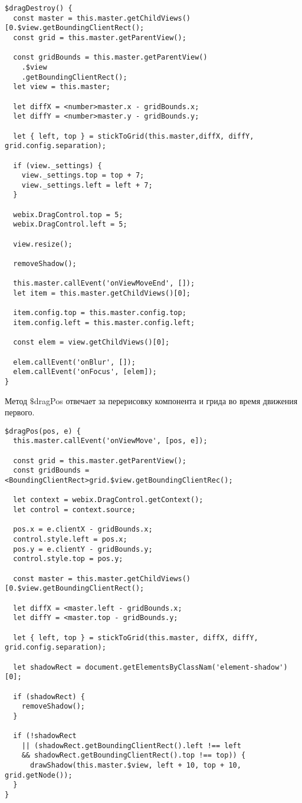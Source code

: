 \begin{lstlisting}
$dragDestroy() {
  const master = this.master.getChildViews()[0.$view.getBoundingClientRect();
  const grid = this.master.getParentView();

  const gridBounds = this.master.getParentView()
    .$view
    .getBoundingClientRect();
  let view = this.master;

  let diffX = <number>master.x - gridBounds.x;
  let diffY = <number>master.y - gridBounds.y;

  let { left, top } = stickToGrid(this.master,diffX, diffY, grid.config.separation);

  if (view._settings) {
    view._settings.top = top + 7;
    view._settings.left = left + 7;
  }

  webix.DragControl.top = 5;
  webix.DragControl.left = 5;

  view.resize();

  removeShadow();

  this.master.callEvent('onViewMoveEnd', []);
  let item = this.master.getChildViews()[0];

  item.config.top = this.master.config.top;
  item.config.left = this.master.config.left;

  const elem = view.getChildViews()[0];

  elem.callEvent('onBlur', []);
  elem.callEvent('onFocus', [elem]);
}
\end{lstlisting}

Метод $\$$dragPos отвечает за перерисовку компонента и грида во время движения первого. 

\begin{lstlisting}
$dragPos(pos, e) {
  this.master.callEvent('onViewMove', [pos, e]);

  const grid = this.master.getParentView();
  const gridBounds = <BoundingClientRect>grid.$view.getBoundingClientRec();

  let context = webix.DragControl.getContext();
  let control = context.source;

  pos.x = e.clientX - gridBounds.x;
  control.style.left = pos.x;
  pos.y = e.clientY - gridBounds.y;
  control.style.top = pos.y;

  const master = this.master.getChildViews()[0.$view.getBoundingClientRect();

  let diffX = <master.left - gridBounds.x;
  let diffY = <master.top - gridBounds.y;

  let { left, top } = stickToGrid(this.master, diffX, diffY, grid.config.separation);

  let shadowRect = document.getElementsByClassNam('element-shadow')[0];

  if (shadowRect) {
    removeShadow();
  }

  if (!shadowRect
    || (shadowRect.getBoundingClientRect().left !== left
    && shadowRect.getBoundingClientRect().top !== top)) {
      drawShadow(this.master.$view, left + 10, top + 10, grid.getNode());
  }
}
\end{lstlisting}

